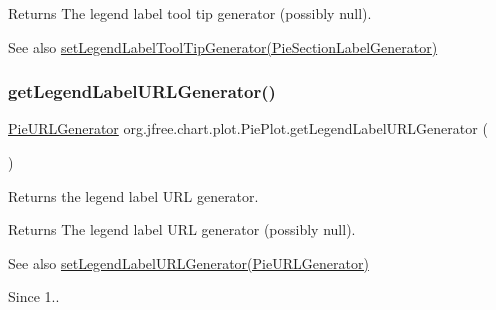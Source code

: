 \begin{DoxyReturn}{Returns}
The legend label tool tip generator (possibly {\ttfamily null}).
\end{DoxyReturn}
\begin{DoxySeeAlso}{See also}
\mbox{\hyperlink{classorg_1_1jfree_1_1chart_1_1plot_1_1_pie_plot_a2d4dcbf8f9fa0f63dac3a75d37b38fc5}{set\+Legend\+Label\+Tool\+Tip\+Generator(\+Pie\+Section\+Label\+Generator)}} 
\end{DoxySeeAlso}
\mbox{\label{classorg_1_1jfree_1_1chart_1_1plot_1_1_pie_plot_a504f2ae046fabdf07dcef72fc1c3d3a5}} 
\subsubsection{\texorpdfstring{get\+Legend\+Label\+U\+R\+L\+Generator()}{getLegendLabelURLGenerator()}}
{\footnotesize\ttfamily \mbox{\hyperlink{interfaceorg_1_1jfree_1_1chart_1_1urls_1_1_pie_u_r_l_generator}{Pie\+U\+R\+L\+Generator}} org.\+jfree.\+chart.\+plot.\+Pie\+Plot.\+get\+Legend\+Label\+U\+R\+L\+Generator (\begin{DoxyParamCaption}{ }\end{DoxyParamCaption})}

Returns the legend label U\+RL generator.

\begin{DoxyReturn}{Returns}
The legend label U\+RL generator (possibly {\ttfamily null}).
\end{DoxyReturn}
\begin{DoxySeeAlso}{See also}
\mbox{\hyperlink{classorg_1_1jfree_1_1chart_1_1plot_1_1_pie_plot_a68b18f13f2db07d91dbdbc4b83ea8057}{set\+Legend\+Label\+U\+R\+L\+Generator(\+Pie\+U\+R\+L\+Generator)}}
\end{DoxySeeAlso}
\begin{DoxySince}{Since}
1.. 
\end{DoxySince}
\mbox{\label{classorg_1_1jfree_1_1chart_1_1plot_1_1_pie_plot_a588ac46cc9ea255020fb6e8f3c92e6ba}} 
